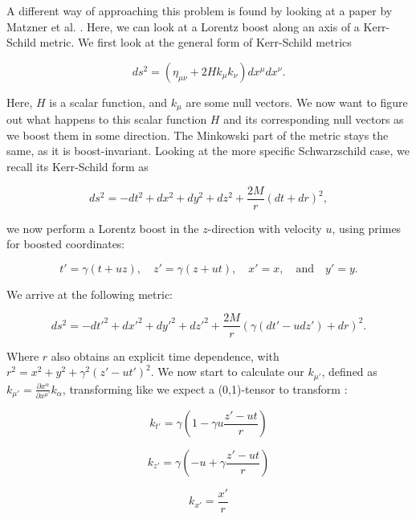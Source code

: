 \documentclass[twoside, openright]{RadboudReport}
\newcommand{\mn}{{\mu\nu}}
\begin{document}
A different way of approaching this problem is found by looking at a paper by Matzner et al. \cite{ksboost}. Here, we can look at a Lorentz boost along an axis of a Kerr-Schild metric. We first look at the general form of Kerr-Schild metrics

\begin{equation}
	ds^2= (\eta_\mn + 2Hk_\mu k_\nu)dx^\mu dx^\nu.
\end{equation}

Here, $H$ is a scalar function, and $k_\mu$ are some null vectors. We now want to figure out what happens to this scalar function $H$ and its corresponding null vectors as we boost them in some direction. The Minkowski part of the metric stays the same, as it is boost-invariant. Looking at the more specific Schwarzschild case, we recall its Kerr-Schild form as

\begin{equation}
	ds^2 = -dt^2 + dx^2+dy^2+dz^2+\frac{2M}{r}(dt+dr)^2,
\end{equation}

\newpage
we now perform a Lorentz boost in the $z$-direction with velocity $u$, using primes for boosted coordinates:

\begin{equation}
	t' = \gamma(t+uz), \quad z' = \gamma(z+ut), \quad x' = x, \quad \text{and} \quad y' = y.
\end{equation}

We arrive at the following metric:

\begin{equation}
	ds^2 = -dt'^2 + dx'^2 +dy'^2 + dz'^2+\frac{2M}{r}\left(\gamma(dt'-udz')+ dr\right)^2.
	\label{eq:boostedschwarzschild}
\end{equation}

Where $r$ also obtains an explicit time dependence, with $r^2 = x^2 + y^2 + \gamma^2(z' - ut')^2$. We now start to calculate our $k_{\mu'}$, defined as $k_{\mu'} = \frac{\partial x^\alpha}{\partial x^{\mu'}}k_\alpha$, transforming like we expect a (0,1)-tensor to transform :

\begin{equation*}
	k_{t'} = \gamma(1-\gamma u\frac{z'-ut}{r})
\end{equation*}

\begin{equation*}
	k_{z'} = \gamma(-u+\gamma \frac{z'-ut}{r})
\end{equation*}

\begin{equation*}
	k_{x'} =\frac{x'}{r}
\end{equation*}
\end{document}
